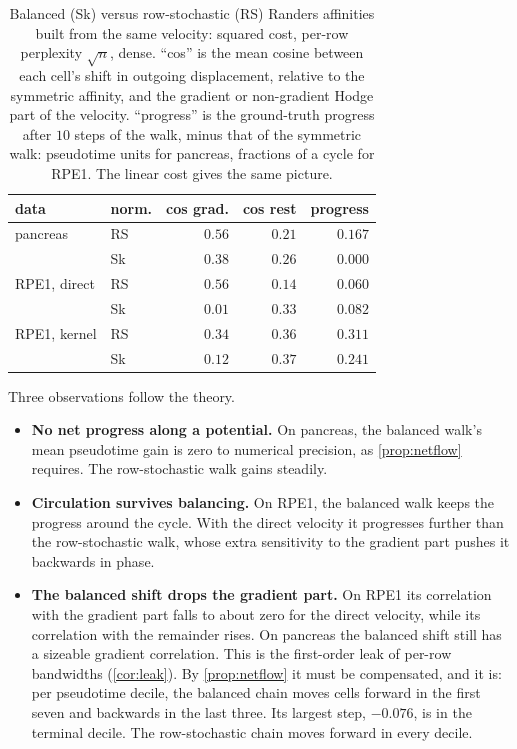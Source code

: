 \begin{table}[t]
  \caption{Balanced (Sk) versus row-stochastic (RS) Randers affinities
    built from the same velocity: squared cost, per-row perplexity
    $\sqrt n$, dense. ``cos'' is the mean cosine between each cell's shift
    in outgoing displacement, relative to the symmetric affinity, and the
    gradient or non-gradient Hodge part of the velocity. ``progress'' is
    the ground-truth progress after $10$ steps of the walk, minus that of
    the symmetric walk: pseudotime units for pancreas, fractions of a cycle
    for RPE1. The linear cost gives the same picture.}
  \label{tab:dsrs}
  \centering\small
  \begin{tabular}{@{}llrrr@{}}
    \toprule
    data & norm. & cos grad. & cos rest & progress \\
    \midrule
    pancreas      & RS & $0.56$ & $0.21$ & $0.167$ \\
                  & Sk & $0.38$ & $0.26$ & $0.000$ \\
    \addlinespace
    RPE1, direct  & RS & $0.56$ & $0.14$ & $0.060$ \\
                  & Sk & $0.01$ & $0.33$ & $0.082$ \\
    \addlinespace
    RPE1, kernel  & RS & $0.34$ & $0.36$ & $0.311$ \\
                  & Sk & $0.12$ & $0.37$ & $0.241$ \\
    \bottomrule
  \end{tabular}
\end{table}

Three observations follow the theory.
\begin{itemize}
  \item \textbf{No net progress along a potential.} On pancreas, the
    balanced walk's mean pseudotime gain is zero to numerical precision,
    as \cref{prop:netflow} requires. The row-stochastic walk gains steadily.
  \item \textbf{Circulation survives balancing.} On RPE1, the balanced walk
    keeps the progress around the cycle. With the direct velocity it
    progresses further than the row-stochastic walk, whose extra
    sensitivity to the gradient part pushes it backwards in phase.
  \item \textbf{The balanced shift drops the gradient part.} On RPE1 its
    correlation with the gradient part falls to about zero for the direct
    velocity, while its correlation with the remainder rises. On pancreas
    the balanced shift still has a sizeable gradient correlation. This is
    the first-order leak of per-row bandwidths (\cref{cor:leak}). By
    \cref{prop:netflow} it must be compensated, and it is: per pseudotime
    decile, the balanced chain moves cells forward in the first seven and
    backwards in the last three. Its largest step, $-0.076$, is in the
    terminal decile. The row-stochastic chain moves forward in every
    decile.
\end{itemize}
